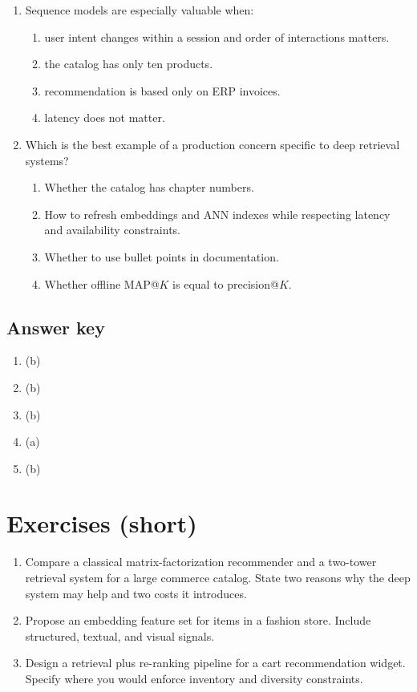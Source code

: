 \begin{enumerate}
  \item Sequence models are especially valuable when:
  \begin{enumerate}
    \item user intent changes within a session and order of interactions matters.
    \item the catalog has only ten products.
    \item recommendation is based only on ERP invoices.
    \item latency does not matter.
  \end{enumerate}

  \item Which is the best example of a production concern specific to deep retrieval systems?
  \begin{enumerate}
    \item Whether the catalog has chapter numbers.
    \item How to refresh embeddings and ANN indexes while respecting latency and availability constraints.
    \item Whether to use bullet points in documentation.
    \item Whether offline MAP@$K$ is equal to precision@$K$.
  \end{enumerate}
\end{enumerate}

\subsection*{Answer key}
\begin{enumerate}
  \item (b)
  \item (b)
  \item (b)
  \item (a)
  \item (b)
\end{enumerate}

\section{Exercises (short)}
\begin{enumerate}
  \item Compare a classical matrix-factorization recommender and a two-tower retrieval system for a large commerce catalog. State two reasons why the deep system may help and two costs it introduces.
  \item Propose an embedding feature set for items in a fashion store. Include structured, textual, and visual signals.
  \item Design a retrieval plus re-ranking pipeline for a cart recommendation widget. Specify where you would enforce inventory and diversity constraints.
\end{enumerate}

